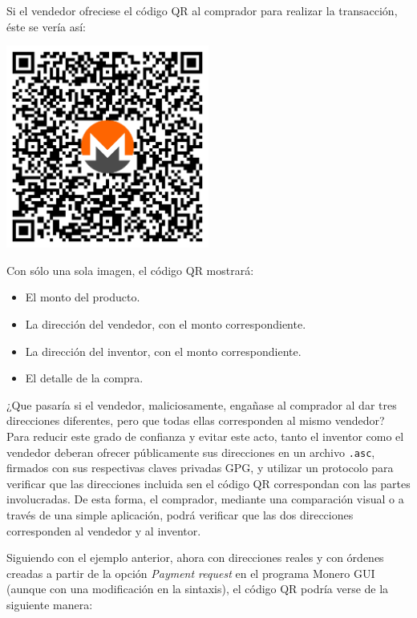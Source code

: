 \documentclass[12pt,a4paper]{article}
\begin{document}
Si el vendedor ofreciese el código QR al comprador para realizar la transacción, éste se vería así:

\begin{center}
\includegraphics[width=0.5\textwidth]{media/qr-code-es.pdf}
\end{center}

Con sólo una sola imagen, el código QR mostrará:

\begin{itemize}
\item El monto del producto.
\item La dirección del vendedor, con el monto correspondiente.
\item La dirección del inventor, con el monto correspondiente.
\item El detalle de la compra.
\end{itemize}

¿Que pasaría si el vendedor, maliciosamente, engañase al comprador al dar tres direcciones diferentes, pero que todas ellas corresponden al mismo vendedor? Para reducir este grado de confianza y evitar este acto, tanto el inventor como el vendedor deberan ofrecer públicamente sus direcciones en un archivo \texttt{.asc}, firmados con sus respectivas claves privadas GPG, y utilizar un protocolo para verificar que las direcciones incluida sen el código QR correspondan con las partes involucradas. De esta forma, el comprador, mediante una comparación visual o a través de una simple aplicación, podrá verificar que las dos direcciones corresponden al vendedor y al inventor.

Siguiendo con el ejemplo anterior, ahora con direcciones reales y con órdenes creadas a partir de la opción \textit{Payment request} en el programa Monero GUI (aunque con una modificación en la sintaxis), el código QR podría verse de la siguiente manera:
\end{document}
